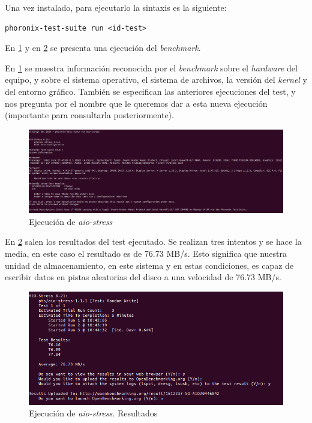 Una vez instalado, para ejecutarlo la sintaxis es la siguiente:

\begin{verbatim}
phoronix-test-suite run <id-test>
\end{verbatim}

En \ref{cuestion1-03} y en \ref{cuestion1-04} se presenta una ejecución del \textit{benchmark}.

En \ref{cuestion1-03} se muestra información reconocida por el \textit{benchmark} sobre el \textit{hardware} del equipo, y sobre el sistema operativo, el sistema de archivos, la versión del \textit{kernel} y del entorno gráfico. También se especifican las anteriores ejecuciones del test, y nos pregunta por el nombre que le queremos dar a esta nueva ejecución (importante para consultarla posteriormente).

\begin{figure}[H]
	\centering
	\includegraphics[scale=0.35]{cuestion1-03.png}
	\caption{Ejecución de \textit{aio-stress}} \label{cuestion1-03}
\end{figure}

En \ref{cuestion1-04} salen los resultados del test ejecutado.
Se realizan tres intentos y se hace la media, en este caso el resultado es de 76.73 MB/s. Esto significa que nuestra unidad de almacenamiento, en este sistema y en estas condiciones, es capaz de escribir datos en pistas aleatorias del disco a una velocidad de 76.73 MB/s.

\begin{figure}[H]
	\centering
	\includegraphics[scale=0.6]{cuestion1-04.png}
	\caption{Ejecución de \textit{aio-stress}. Resultados} \label{cuestion1-04}
\end{figure}



